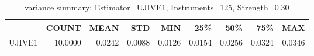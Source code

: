 \begin{table}[ht]
\centering
\caption{variance summary: Estimator=UJIVE1, Instruments=125, Strength=0.30}
\begin{tabular}{lrrrrrrrr}
\toprule
 & COUNT & MEAN & STD & MIN & 25\% & 50\% & 75\% & MAX \\
\midrule
UJIVE1 & 10.0000 & 0.0242 & 0.0088 & 0.0126 & 0.0154 & 0.0256 & 0.0324 & 0.0346 \\
\bottomrule
\end{tabular}
\end{table}

